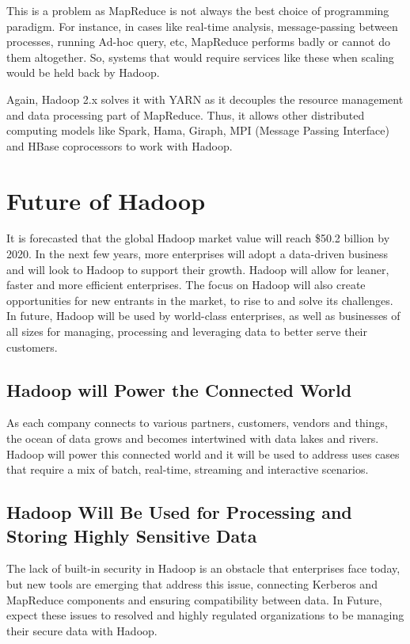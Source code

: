 \documentclass[conference]{IEEEtran}
\begin{document}
This is a problem as MapReduce is not always the best choice of programming paradigm. 
For instance, in cases like real-time analysis, message-passing between processes, running Ad-hoc query, etc, 
MapReduce performs badly or cannot do them altogether. So, systems that would require services like these when scaling 
would be held back by Hadoop. 

Again, Hadoop 2.x solves it with YARN as it decouples the resource management and data processing part of MapReduce. 
Thus, it allows other distributed computing models like Spark, Hama, Giraph, MPI (Message Passing Interface) and HBase 
coprocessors to work with Hadoop. 

\section{Future of Hadoop}

It is forecasted that the global Hadoop market value will reach \$50.2 billion 
by 2020. In the next few years, more enterprises will adopt a data-driven 
business and will look to Hadoop to support their growth. Hadoop will allow 
for leaner, faster and more efficient enterprises. The focus on Hadoop will 
also create opportunities for new entrants in the market, to rise to and solve 
its challenges. In future, Hadoop will be used by world-class enterprises, 
as well as businesses of all sizes for managing, processing and leveraging 
data to better serve their customers.

\subsection{Hadoop will Power the Connected World}
As each company connects to various partners, customers, vendors and things,
the ocean of data grows and becomes intertwined with data lakes and rivers. 
Hadoop will power this connected world and it will be used to address
uses cases that require a mix of batch, real-time, streaming and interactive 
scenarios.

\subsection{Hadoop Will Be Used for Processing and Storing Highly Sensitive Data}
The lack of built-in security in Hadoop is an obstacle that enterprises face 
today, but new tools are emerging that address this issue, connecting Kerberos 
and MapReduce components and ensuring compatibility between data. In Future, 
expect these issues to resolved and highly regulated organizations to be managing their secure data with Hadoop.
\end{document}
